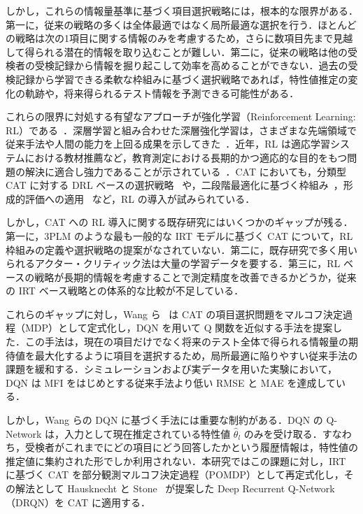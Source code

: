 \documentclass[dvipdfmx,a4j]{jarticle}
\begin{document}
しかし，これらの情報量基準に基づく項目選択戦略には，根本的な限界がある．第一に，従来の戦略の多くは全体最適ではなく局所最適な選択を行う．ほとんどの戦略は次の1項目に関する情報のみを考慮するため，さらに数項目先まで見越して得られる潜在的情報を取り込むことが難しい．第二に，従来の戦略は他の受検者の受検記録から情報を掘り起こして効率を高めることができない．過去の受検記録から学習できる柔軟な枠組みに基づく選択戦略であれば，特性値推定の変化の軌跡や，将来得られるテスト情報を予測できる可能性がある．

これらの限界に対処する有望なアプローチが強化学習（Reinforcement Learning: RL）である~\cite{sutton2018}．深層学習と組み合わせた深層強化学習は，さまざまな先端領域で従来手法や人間の能力を上回る成果を示してきた~\cite{silver2016,silver2017}．近年，RL は適応学習システムにおける教材推薦など，教育測定における長期的かつ適応的な目的をもつ問題の解決に適合し強力であることが示されている~\cite{chen2018,han2020,li2021,li2023,tan2020,tang2019}．CAT においても，分類型 CAT に対する DRL ベースの選択戦略~\cite{nurakhmetov2019} や，二段階最適化に基づく枠組み~\cite{ghosh2021}，形成的評価への適用~\cite{shin2022} など，RL の導入が試みられている．

しかし，CAT への RL 導入に関する既存研究にはいくつかのギャップが残る．第一に，3PLM のような最も一般的な IRT モデルに基づく CAT について，RL 枠組みの定義や選択戦略の提案がなされていない．第二に，既存研究で多く用いられるアクター・クリティック法は大量の学習データを要する．第三に，RL ベースの戦略が長期的情報を考慮することで測定精度を改善できるかどうか，従来の IRT ベース戦略との体系的な比較が不足している．

これらのギャップに対し，Wang ら~\cite{wang2024} は CAT の項目選択問題をマルコフ決定過程（MDP）として定式化し，DQN を用いて Q 関数を近似する手法を提案した．この手法は，現在の項目だけでなく将来のテスト全体で得られる情報量の期待値を最大化するように項目を選択するため，局所最適に陥りやすい従来手法の課題を緩和する．シミュレーションおよび実データを用いた実験において，DQN は MFI をはじめとする従来手法より低い RMSE と MAE を達成している．

しかし，Wang らの DQN に基づく手法には重要な制約がある．DQN の Q-Network は，入力として現在推定されている特性値 $\hat{\theta}_l$ のみを受け取る．すなわち，受検者がこれまでにどの項目にどう回答したかという履歴情報は，特性値の推定値に集約された形でしか利用されない．本研究ではこの課題に対し，IRT に基づく CAT を部分観測マルコフ決定過程（POMDP）として再定式化し，その解法として Hausknecht と Stone~\cite{hausknecht2015} が提案した Deep Recurrent Q-Network（DRQN）を CAT に適用する．
\end{document}
